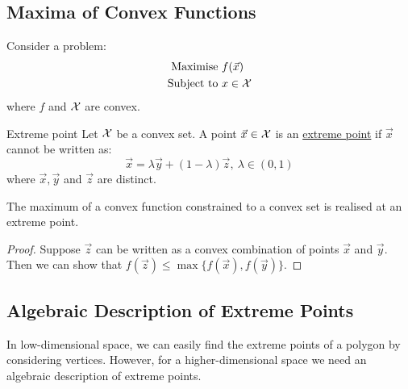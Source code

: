 \documentclass[../Main.tex]{subfiles}
\begin{document}
\subsection{Maxima of Convex Functions}
Consider a problem:
\begin{align*}
    \text{Maximise } &f(\vec{x}) \\
    \text{Subject to } &x \in \mathcal{X}
\end{align*}
where $f$ and $\mathcal{X}$ are convex.
\begin{definition}{Extreme point}
    Let $\mathcal{X}$ be a convex set. A point $\vec{x} \in \mathcal{X}$ is an \underline{extreme point} if $\vec{x}$ cannot be written as:
    \begin{equation*}
        \vec{x} = \lambda \vec{y} + (1-\lambda) \vec{z},~\lambda \in (0, 1)
    \end{equation*}
    where $\vec{x}, \vec{y}$ and $\vec{z}$ are distinct.
\end{definition}
\begin{theorem}
    The maximum of a convex function constrained to a convex set is realised at an extreme point.
\end{theorem}
\begin{proof}
    Suppose $\vec{z}$ can be written as a convex combination of points $\vec{x}$ and $\vec{y}$. Then we can show that $f(\vec{z}) \leq \max\{f(\vec{x}), f(\vec{y})\}$.
\end{proof}
\subsection{Algebraic Description of Extreme Points}
In low-dimensional space, we can easily find the extreme points of a polygon by considering vertices. However, for a higher-dimensional space we need an algebraic description of extreme points.
\end{document}

